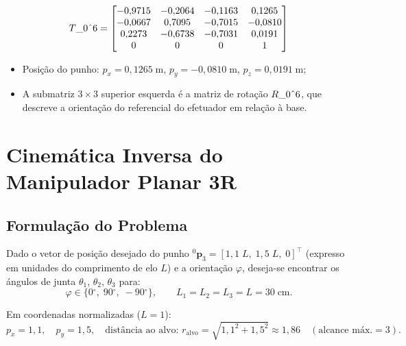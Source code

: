 \documentclass[12pt,a4paper]{article}
\def\Trans#1#2{T\string_#1\string^#2}%
\def\Rot#1#2{R\string_#1\string^#2}%
\newcommand{\Trans}[2]{{}^{#1}_{#2}\!\mathbf{T}}
\newcommand{\Rot}[2]{{}^{#1}_{#2}\!\mathbf{R}}
\newcommand{\degr}{\ensuremath{^{\circ}}}
\begin{document}
\begin{tcolorbox}[resultbox, title=Posi\c{c}\~ao e Orienta\c{c}\~ao do Punho do PUMA~560 --- $\Trans{0}{6}$]
\[
  \Trans{0}{6} =
  \begin{bmatrix}
    -0{,}9715 & -0{,}2064 & -0{,}1163 &  0{,}1265 \\
    -0{,}0667 &  0{,}7095 & -0{,}7015 & -0{,}0810 \\
     0{,}2273 & -0{,}6738 & -0{,}7031 &  0{,}0191 \\
     0        &  0        &  0        &  1
  \end{bmatrix}
\]
\vspace{4pt}
\begin{itemize}[leftmargin=1.5cm, itemsep=2pt]
  \item Posi\c{c}\~ao do punho:
        $p_x = 0{,}1265\;\text{m}$,\;
        $p_y = -0{,}0810\;\text{m}$,\;
        $p_z = 0{,}0191\;\text{m}$;
  \item A submatriz $3\times3$ superior esquerda \'e a matriz de rota\c{c}\~ao
        $\Rot{0}{6}$, que descreve a orienta\c{c}\~ao do referencial do efetuador
        em rela\c{c}\~ao \`a base.
\end{itemize}
\end{tcolorbox}

\newpage
\section{Cinem\'atica Inversa do Manipulador Planar 3R}

\subsection{Formula\c{c}\~ao do Problema}

Dado o vetor de posi\c{c}\~ao desejado do punho
${}^0\mathbf{p}_3 = [1{,}1\;L,\; 1{,}5\;L,\; 0]^\top$
(expresso em unidades do comprimento de elo $L$) e a orienta\c{c}\~ao $\varphi$,
deseja-se encontrar os \'angulos de junta $\theta_1$, $\theta_2$, $\theta_3$ para:
\[
  \varphi \in \{0\degr,\; 90\degr,\; -90\degr\}, \qquad
  L_1 = L_2 = L_3 = L = 30\;\text{cm}.
\]

Em coordenadas normalizadas ($L=1$):
\[
  p_x = 1{,}1, \quad p_y = 1{,}5, \quad
  \text{dist\^ancia ao alvo: } r_\text{alvo} = \sqrt{1{,}1^2+1{,}5^2} \approx 1{,}86
  \quad (\text{alcance m\'ax.}=3).
\]
\end{document}

